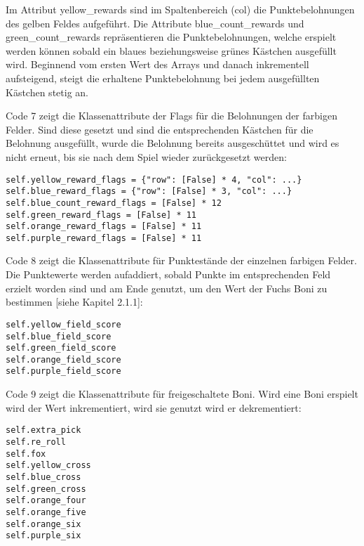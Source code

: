 Im Attribut yellow\_rewards sind im Spaltenbereich (col) die Punktebelohnungen des gelben Feldes aufgeführt. Die Attribute blue\_count\_rewards und green\_count\_rewards repräsentieren die Punktebelohnungen, welche erspielt werden können sobald ein blaues beziehungsweise grünes Kästchen ausgefüllt wird. Beginnend vom ersten Wert des Arrays und danach inkrementell aufsteigend, steigt die erhaltene Punktebelohnung bei jedem ausgefüllten Kästchen stetig an.\\

\begin{minipage}{\linewidth}
Code 7 zeigt die Klassenattribute der Flags für die Belohnungen der farbigen Felder. Sind diese gesetzt und sind die entsprechenden Kästchen für die Belohnung ausgefüllt, wurde die Belohnung bereits ausgeschüttet und wird es nicht erneut, bis sie nach dem Spiel wieder zurückgesetzt werden:
\vspace{0.5cm}
\begin{lstlisting}[caption={Klassenattribute für Belohnungsflags}, basicstyle=\ttfamily]
self.yellow_reward_flags = {"row": [False] * 4, "col": ...}
self.blue_reward_flags = {"row": [False] * 3, "col": ...}
self.blue_count_reward_flags = [False] * 12
self.green_reward_flags = [False] * 11
self.orange_reward_flags = [False] * 11
self.purple_reward_flags = [False] * 11
\end{lstlisting}
\end{minipage}

\begin{minipage}{\linewidth}
Code 8 zeigt die Klassenattribute für Punktestände der einzelnen farbigen Felder. Die Punktewerte werden aufaddiert, sobald Punkte im entsprechenden Feld erzielt worden sind und am Ende genutzt, um den Wert der Fuchs Boni zu bestimmen [siehe Kapitel 2.1.1]:
\vspace{0.5cm}
\begin{lstlisting}[caption={Klassenattribute für erreichte Punktestände der einzelnen farbigen Felder}, basicstyle=\ttfamily]
self.yellow_field_score
self.blue_field_score
self.green_field_score
self.orange_field_score
self.purple_field_score
\end{lstlisting}
\end{minipage}

\begin{minipage}{\linewidth}
Code 9 zeigt die Klassenattribute für freigeschaltete Boni. Wird eine Boni erspielt wird der Wert inkrementiert, wird sie genutzt wird er dekrementiert:
\vspace{0.5cm}
\begin{lstlisting}[caption={Klassenattribute für freigespielte Boni}, basicstyle=\ttfamily]
self.extra_pick
self.re_roll
self.fox
self.yellow_cross
self.blue_cross
self.green_cross
self.orange_four
self.orange_five
self.orange_six
self.purple_six
\end{lstlisting}
\end{minipage}

